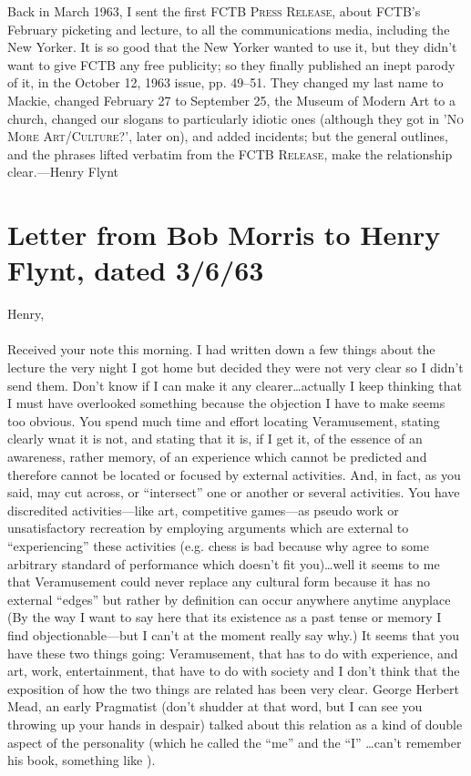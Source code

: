 Back in March 1963, I sent the first \textsc{FCTB Press Release}, about FCTB's 
February picketing and lecture, to all the communications media, including 
the New Yorker. It is so good that the New Yorker wanted to use it, but 
they didn't want to give FCTB any free publicity; so they finally published 
an inept parody of it, in the October 12, 1963 issue, pp. 49--51. They 
changed my last name to Mackie, changed February 27 to September 25, the 
Museum of Modern Art to a church, changed our slogans to particularly 
idiotic ones (although they got in '\textsc{No More Art/Culture?}', later on), 
and added incidents; but the general outlines, and the phrases lifted verbatim 
from the \textsc{FCTB Release}, make the relationship clear.---Henry Flynt 

\clearpage

\section*{{\normalsize Letter from Bob Morris to Henry Flynt, dated 3/6/63}}


\vfill 

\noindent
Henry, \\
\\
Received your note this morning. I had written down a few things about the 
lecture the very night I got home but decided they were not very clear so I 
didn't send them. Don't know if I can make it any clearer\ldots actually I keep 
thinking that I must have overlooked something because the objection I have 
to make seems too obvious. You spend much time and effort locating 
Veramusement, stating clearly wnat it is not, and stating that it is, if I get it, 
of the essence of an awareness, rather memory, of an experience which 
cannot be predicted and therefore cannot be located or focused by external 
activities. And, in fact, as you said, may cut across, or \enquote{intersect} one or 
another or several activities. You have discredited activities---like art, 
competitive games---as pseudo work or unsatisfactory recreation by employing 
arguments which are external to \enquote{experiencing} these activities (e.g. chess is 
bad because why agree to some arbitrary standard of performance which 
doesn't fit you)\ldots well it seems to me that Veramusement could never replace 
any cultural form because it has no external \enquote{edges} but rather by definition 
can occur anywhere anytime anyplace (By the way I want to say here that 
its existence as a past tense or memory I find objectionable---but I can't at the 
moment really say why.) It seems that you have these two things going: 
Veramusement, that has to do with experience, and art, work, 
entertainment, that have to do with society and I don't think that the 
exposition of how the two things are related has been very clear. George 
Herbert Mead, an early Pragmatist (don't shudder at that word, but I can see 
you throwing up your hands in despair) talked about this relation as a kind 
of double aspect of the personality (which he called the \enquote{me} and the \enquote{I} 
\ldots can't remember his book, something like ). 


